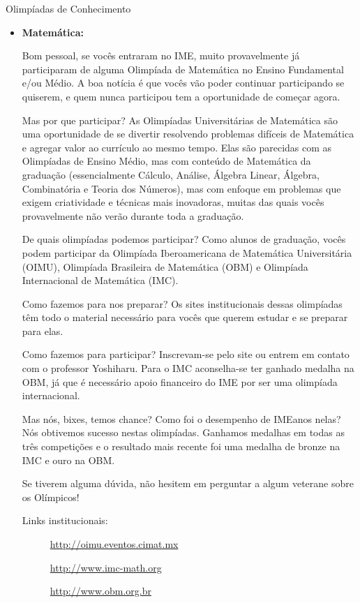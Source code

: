 \begin{subsecao}{Olimpíadas de Conhecimento}

\begin{itemize}

\item{\bf Matemática: }

Bom pessoal, se vocês entraram no IME, muito provavelmente já participaram
de alguma Olimpíada de Matemática no Ensino Fundamental e/ou Médio. A
boa notícia é que vocês vão poder continuar participando se quiserem,
e quem nunca participou tem a oportunidade de começar agora.

Mas por que participar? As Olimpíadas Universitárias de Matemática são uma
oportunidade de se divertir resolvendo problemas difíceis de Matemática e agregar
valor ao currículo ao mesmo tempo. Elas são parecidas com as Olimpíadas de
Ensino Médio, mas com conteúdo de Matemática da graduação (essencialmente
Cálculo, Análise, Álgebra Linear, Álgebra, Combinatória e Teoria dos Números),
mas com enfoque em problemas que exigem criatividade e técnicas mais inovadoras,
muitas das quais vocês provavelmente não verão durante toda a graduação.

De quais olimpíadas podemos participar? Como alunos de graduação, vocês podem
participar da Olimpíada Iberoamericana de Matemática Universitária (OIMU),
Olimpíada Brasileira de Matemática (OBM) e Olimpíada Internacional de
Matemática (IMC).

Como fazemos para nos preparar? Os sites institucionais dessas olimpíadas
têm todo o material necessário para vocês que querem estudar e se preparar
para elas.

Como fazemos para participar? Inscrevam-se pelo site ou entrem em contato com
o professor Yoshiharu. Para o IMC aconselha-se ter ganhado medalha na OBM,
já que é necessário apoio financeiro do IME por ser uma olimpíada internacional.

Mas nós, bixes, temos chance? Como foi o desempenho de IMEanos nelas? Nós
obtivemos sucesso nestas olimpíadas. Ganhamos medalhas em todas as três
competições e o resultado mais recente foi uma medalha de bronze na IMC e ouro
na OBM.

Se tiverem alguma dúvida, não hesitem em perguntar a algum veterane sobre os
Olímpicos!

Links institucionais:

\begin{description}
  \item[] \url{http://oimu.eventos.cimat.mx}
  \item[] \url{http://www.imc-math.org}
  \item[] \url{http://www.obm.org.br}
\end{description}


\end{itemize}
\end{subsecao}
